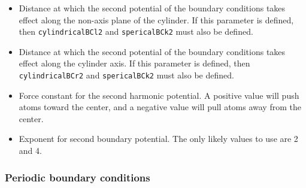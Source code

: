 \begin{itemize}
\item
{}
{Distance at which the second potential of the boundary conditions takes
effect along the non-axis plane of the cylinder.
If this parameter is defined, then \verb!cylindricalBCl2! and \verb!spericalBCk2! must also
be defined.}

\item
{}
{Distance at which the second potential of the boundary conditions takes
effect along the cylinder axis.
If this parameter is defined, then \verb!cylindricalBCr2! and \verb!spericalBCk2! must also
be defined.}

\item
{}
{Force constant for the second harmonic potential.  A positive
value will push atoms toward the center, and a negative
value will pull atoms away from the center.}

\item
{}
{Exponent for second boundary potential.  The only likely values to
use are 2 and 4.}

\end{itemize}

%
%
%
%
%

\subsubsection{Periodic boundary conditions}

